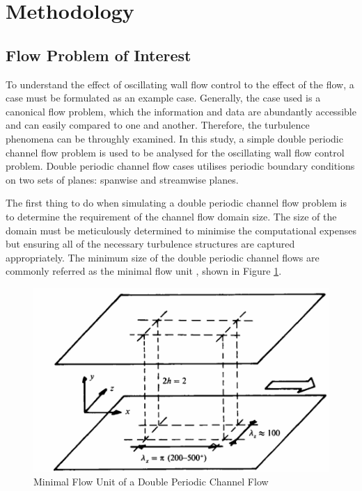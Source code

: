 \clearpage
\section{Methodology}
\label{sec:Methodology}



\subsection{Flow Problem of Interest}
\label{sec:Flow problem of interest}
To understand the effect of oscillating wall flow control to the effect of the flow, a case must be formulated as an example case. Generally, the case used is a canonical flow problem, which the information and data are abundantly accessible and can easily compared to one and another. Therefore, the turbulence phenomena can be throughly examined. In this study, a simple double periodic channel flow problem is used to be analysed for the oscillating wall flow control problem. Double periodic channel flow cases utilises periodic boundary conditions on two sets of planes: spanwise and streamwise planes. 

The first thing to do when simulating a double periodic channel flow problem is to determine the requirement of the channel flow domain size. The size of the domain must be meticulously determined to minimise the computational expenses but ensuring all of the necessary turbulence structures are captured appropriately. The minimum size of the double periodic channel flows are commonly referred as the minimal flow unit \cite{Jimenez1991}, shown in Figure \ref{fig:jimenezmfu}.

\begin{figure}[ht]
	\centering
	\includegraphics[width=0.6\linewidth]{Figures/JimenezMFU}
	\caption{Minimal Flow Unit of a Double Periodic Channel Flow~\cite{Jimenez1991}}
	\label{fig:jimenezmfu}
\end{figure}

